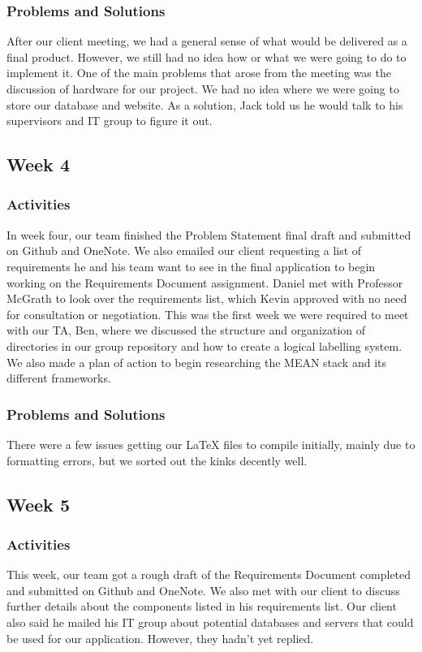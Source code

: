 \documentclass[journal,10pt,onecolumn,compsoc]{IEEEtran} \usepackage[margin=1.0in]{geometry} \usepackage{pdfpages}
\begin{document}
    \subsubsection{Problems and Solutions} 
	After our client meeting, we had a general sense of what would be delivered as a final product. However, we still had no idea how or what we were going to do to implement it. One of the main problems that arose from the meeting was the discussion of hardware for our project. We had no idea where we were going to store our database and website. As a solution, Jack told us he would talk to his supervisors and IT group to figure it out.
    \subsection{Week 4}
    \subsubsection{Activities} 
    In week four, our team finished the Problem Statement final draft and submitted on Github and OneNote. We also emailed our client requesting a list of requirements he and his team want to see in the final application to begin working on the Requirements Document assignment. Daniel met with Professor McGrath to look over the requirements list, which Kevin approved with no need for consultation or negotiation.
    \noindent This was the first week we were required to meet with our TA, Ben, where we discussed the structure and organization of directories in our group repository and how to create a logical labelling system. We also made a plan of action to begin researching the MEAN stack and its different frameworks.
    
    \subsubsection{Problems and Solutions} 
	There were a few issues getting our LaTeX files to compile initially, mainly due to formatting errors, but we sorted out the kinks decently well.
	
    \subsection{Week 5}    
    \subsubsection{Activities} 
    This week, our team got a rough draft of the Requirements Document completed and submitted on Github and OneNote. We also met with our client to discuss further details about the components listed in his requirements list. Our client also said he mailed his IT group about potential databases and servers that could be used for our application. However, they hadn't yet replied.
	
\end{document}

